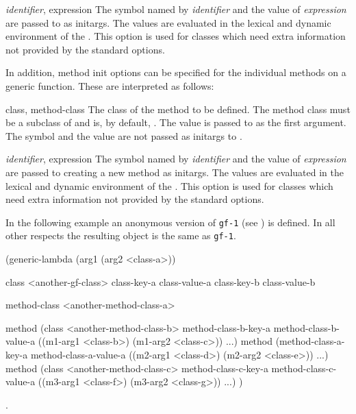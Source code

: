 \begin{optDefinition}
\begin{options}
    \item[{\em identifier}, expression] The symbol named by {\em identifier} and
    the value of {\em expression} are passed to  as initargs.
    The values are evaluated in the lexical and dynamic environment of the
    .  This option is used for classes which need extra
    information not provided by the standard options.
\end{options}
%
In addition, method init options can be specified for the individual
methods on a generic function.  These are interpreted as follows:
%
\begin{options}
    \item[class, method-class]%
    The class of the method to be defined. The method class must be a subclass
    of  and is, by default, . The value is
    passed to  as the first argument. The symbol and the value
    are not passed as initargs to .

    \item[{\em identifier}, expression]%
    The symbol named by {\em identifier} and the value of {\em expression} are
    passed to  creating a new method as initargs.  The values
    are evaluated in the lexical and dynamic environment of the
    .  This option is used for classes which need extra
    information not provided by the standard options.
\end{options}
%
\examples
 In the following example an anonymous version of {\tt gf-1} (see
) is defined.  In all other respects the resulting object
is the same as {\tt gf-1}.
%
{\small\syntax
(generic-lambda (arg1 (arg2 <class-a>))

  class <another-gf-class>
  class-key-a class-value-a
  class-key-b class-value-b

  method-class <another-method-class-a>

  method (class <another-method-class-b>
          method-class-b-key-a method-class-b-value-a
          ((m1-arg1 <class-b>) (m1-arg2 <class-c>))
          ...)
  method (method-class-a-key-a method-class-a-value-a
          ((m2-arg1 <class-d>) (m2-arg2 <class-e>))
          ...)
  method (class <another-method-class-c>
          method-class-c-key-a method-class-c-value-a
          ((m3-arg1 <class-f>) (m3-arg2 <class-g>))
          ...)
)
\endsyntax}
%
\seealso%
.


\end{optDefinition}
